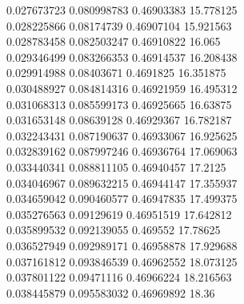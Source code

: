 {0.027673723 0.080998783 0.46903383 15.778125\\
0.028225866 0.08174739 0.46907104 15.921563\\
0.028783458 0.082503247 0.46910822 16.065\\
0.029346499 0.083266353 0.46914537 16.208438\\
0.029914988 0.08403671 0.4691825 16.351875\\
0.030488927 0.084814316 0.46921959 16.495312\\
0.031068313 0.085599173 0.46925665 16.63875\\
0.031653148 0.08639128 0.46929367 16.782187\\
0.032243431 0.087190637 0.46933067 16.925625\\
0.032839162 0.087997246 0.46936764 17.069063\\
0.033440341 0.088811105 0.46940457 17.2125\\
0.034046967 0.089632215 0.46944147 17.355937\\
0.034659042 0.090460577 0.46947835 17.499375\\
0.035276563 0.09129619 0.46951519 17.642812\\
0.035899532 0.092139055 0.469552 17.78625\\
0.036527949 0.092989171 0.46958878 17.929688\\
0.037161812 0.093846539 0.46962552 18.073125\\
0.037801122 0.09471116 0.46966224 18.216563\\
0.038445879 0.095583032 0.46969892 18.36\\
}\CurveTable
